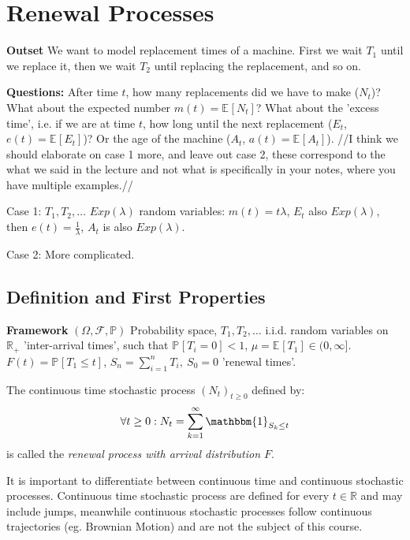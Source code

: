\chapter{Renewal Processes}
\textbf{Outset} We want to model replacement times of a machine. First we wait $T_1$ until we replace it, then we wait $T_2$ until replacing the replacement, and so on.

\noindent
\textbf{Questions:} After time $t$, how many replacements did we have to make ($N_t$)? What about the expected number $m(t)=\mathbb{E}_{} \left[ N_t \right] $?
What about the 'excess time', i.e. if we are at time $t$, how long until the next replacement ($E_t$, $e(t)=\mathbb{E}_{} \left[ E_t \right]$)? Or the age of the machine ($A_t$, $a(t)=\mathbb{E}_{} \left[ A_t \right] $).
{\color{blue} //I think we should elaborate on case 1 more, and leave out case 2, these correspond to the what we said in the lecture and not what is specifically in your notes, where you have multiple examples.//}

Case 1: $T_1, T_2, \ldots$  $Exp(\lambda)$ random variables: $m(t)=t\lambda$, $E_t$ also $Exp(\lambda)$, then $e(t)= \frac{1}{\lambda}$, $A_t$ is also $Exp(\lambda)$.

Case 2: More complicated.

\section{Definition and First Properties}
\textbf{Framework} $(\Omega, \mathcal{F}, \mathbb{P})$ Probability space, $T_1, T_2, \ldots $  i.i.d. random variables on $\mathbb{R}_+$ 'inter-arrival times', such that $\mathbb{P}_{} \left[ T_i = 0 \right] < 1$, $\mu = \mathbb{E}_{} \left[ T_1 \right] \in (0, \infty]$. $F(t) =  \mathbb{P}_{} \left[ T_1 \leq t \right] $, $S_n = \sum_{i=1}^{n} T_i,\ S_0 =0$ 'renewal times'.
\begin{defn}
	The continuous time stochastic process $(N_t)_{t\geq 0}$ defined by:
\begin{align}
	\forall t \geq 0: N_t = \sum_{k=1}^{\infty} \mathbbm{1}_{S_k \leq t}
\end{align}
is called the \emph{renewal process with arrival distribution $F$}.
\end{defn}
{\color{blue}
\begin{rmk}[]
	It is important to differentiate between continuous time and continuous stochastic processes. Continuous time stochastic process are defined for every $t \in \mathbb{R}$ and may include jumps, meanwhile continuous stochastic processes follow continuous trajectories (eg.  Brownian Motion) and are not the subject of this course.
\end{rmk}
}

